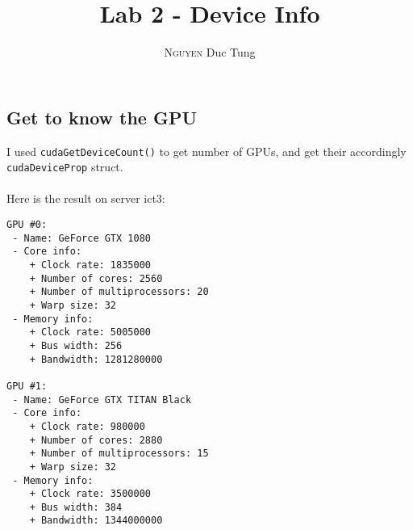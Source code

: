 \documentclass[12pt]{article}
\title{Lab 2 - Device Info}
\author{\textsc{Nguyen} Duc Tung}
\date{}
\begin{document}
\maketitle

\subsection*{Get to know the GPU}
I used \colorbox{backcolour}{\lstinline{cudaGetDeviceCount()}} to get number of GPUs, and get their accordingly \colorbox{backcolour}{\lstinline{cudaDeviceProp}} struct.
\\\\
Here is the result on server ict3:

\begin{lstlisting}
GPU #0:
 - Name: GeForce GTX 1080
 - Core info:
    + Clock rate: 1835000
    + Number of cores: 2560
    + Number of multiprocessors: 20
    + Warp size: 32
 - Memory info:
    + Clock rate: 5005000
    + Bus width: 256
    + Bandwidth: 1281280000

GPU #1:
 - Name: GeForce GTX TITAN Black
 - Core info:
    + Clock rate: 980000
    + Number of cores: 2880
    + Number of multiprocessors: 15
    + Warp size: 32
 - Memory info:
    + Clock rate: 3500000
    + Bus width: 384
    + Bandwidth: 1344000000
\end{lstlisting}
\end{document}
